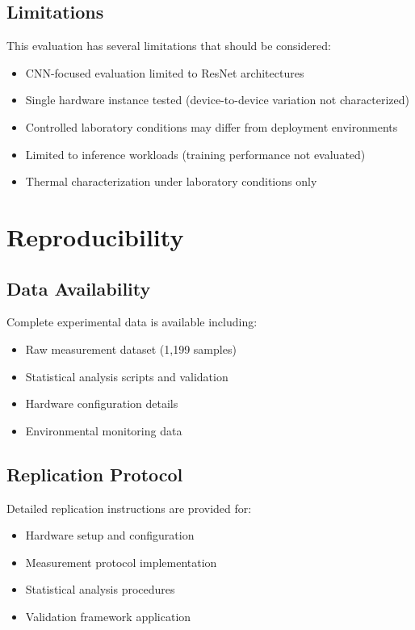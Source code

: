 \documentclass[journal]{IEEEtran}
\begin{document}
\subsection{Limitations}

This evaluation has several limitations that should be considered:
\begin{itemize}
    \item CNN-focused evaluation limited to ResNet architectures
    \item Single hardware instance tested (device-to-device variation not characterized)
    \item Controlled laboratory conditions may differ from deployment environments
    \item Limited to inference workloads (training performance not evaluated)
    \item Thermal characterization under laboratory conditions only
\end{itemize}

\section{Reproducibility}

\subsection{Data Availability}

Complete experimental data is available including:
\begin{itemize}
    \item Raw measurement dataset (1,199 samples)
    \item Statistical analysis scripts and validation
    \item Hardware configuration details
    \item Environmental monitoring data
\end{itemize}

\subsection{Replication Protocol}

Detailed replication instructions are provided for:
\begin{itemize}
    \item Hardware setup and configuration
    \item Measurement protocol implementation
    \item Statistical analysis procedures
    \item Validation framework application
\end{itemize}
\end{document}
